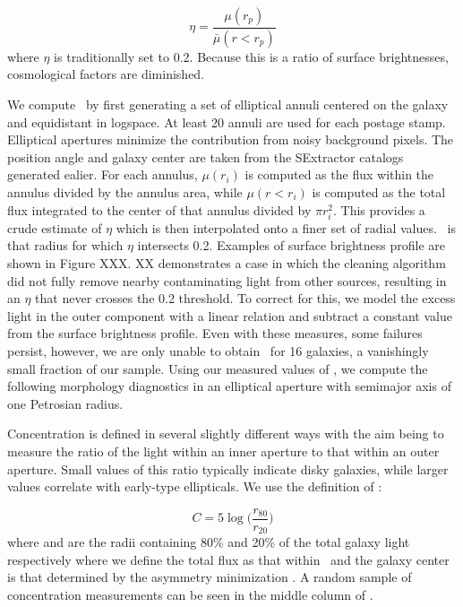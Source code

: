 \begin{equation}\label{fig: petrosian raidus}
\eta = \frac{\mu(r_p)}{\bar\mu(r<r_p)}
\end{equation}
where $\eta$ is traditionally set to 0.2. Because this is a ratio of surface brightnesses, cosmological factors are diminished. 

We compute \rp~by first generating a set of elliptical annuli centered on the galaxy and equidistant in logspace. At least 20 annuli are used for each postage stamp. Elliptical apertures minimize the contribution from noisy background pixels. The position angle and galaxy center are taken from the SExtractor catalogs generated ealier. For each annulus, $\mu(r_i)$ is computed as the flux within the annulus divided by the annulus area, while $\mu(r<r_i)$ is computed as the total flux integrated to the center of that annulus divided by $\pi r_i^2$. This provides a crude estimate of $\eta$ which is then interpolated onto a finer set of radial values.  \rp~is that radius for which $\eta$ intersects 0.2. Examples of surface brightness profile are shown in Figure XXX. XX demonstrates a case in which the cleaning algorithm did not fully remove nearby contaminating light from other sources, resulting in an $\eta$ that never crosses the 0.2 threshold. To correct for this, we model the excess light in the outer component with a linear relation and subtract a constant value from the surface brightness profile. Even with these measures, some failures persist, however, we are only unable to obtain \rp~for 16 galaxies, a vanishingly small fraction of our sample. Using our measured values of \rp, we compute the following morphology diagnostics in an elliptical aperture with semimajor axis of one Petrosian radius. 


Concentration is defined in several slightly different ways with the aim being to measure the ratio of the light within an inner aperture to that within an outer aperture. Small values of this ratio typically indicate disky galaxies, while larger values correlate with early-type ellipticals. We use the definition of \cite{Bershady2000}:

\begin{equation}\label{eqn: concentration}
C = 5\log\Big(\frac{r_{80}}{r_{20}}\Big) 
\end{equation}
where  and  are the radii containing 80\% and 20\% of the total galaxy light respectively where we define the total flux as that within \rp~and the galaxy center is that determined by the asymmetry minimization \cite[described below,][]{Lotz2004}. A random sample of concentration measurements can be seen in the middle column of . 

